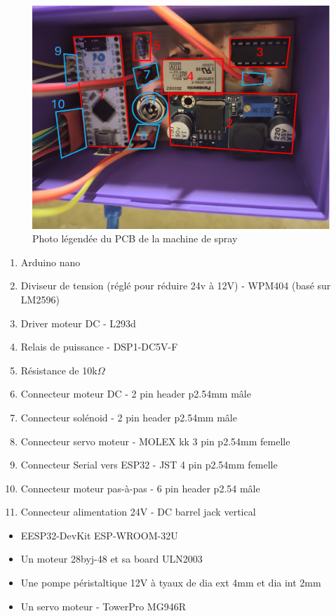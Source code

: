 \begin{figure}[H]
    \centering
    \includegraphics[width = \textwidth, trim = {0 20cm 0 0}, clip]{assets/figures/ameliorations/PCB_machine_spray.png}
    \caption{Photo légendée du PCB de la machine de spray}
\end{figure}
\begin{enumerate}
    \item Arduino nano
    \item Diviseur de tension (réglé pour réduire 24v à 12V) - WPM404 (basé sur LM2596)
    \item Driver moteur DC - L293d
    \item Relais de puissance - DSP1-DC5V-F
    \item Résistance de 10k$\Omega$
    \item Connecteur moteur DC - 2 pin header p2.54mm mâle
    \item Connecteur solénoid - 2 pin header p2.54mm mâle
    \item Connecteur servo moteur - MOLEX kk 3 pin p2.54mm femelle
    \item Connecteur Serial vers ESP32 - JST 4 pin p2.54mm femelle
    \item Connecteur moteur pas-à-pas - 6 pin header p2.54 mâle
    \item Connecteur alimentation 24V - DC barrel jack vertical
\end{enumerate}
\begin{itemize}
    \item EESP32-DevKit ESP-WROOM-32U
    \item Un moteur 28byj-48 et sa board ULN2003
    \item Une pompe péristaltique 12V à tyaux de dia ext 4mm et dia int 2mm
    \item Un servo moteur - TowerPro MG946R
\end{itemize}

